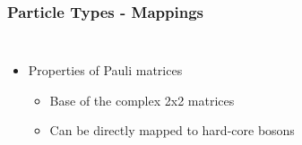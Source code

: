     \begin{frame}[t]
        \frametitle{Particle Types - Mappings}
        
        \begin{columns}[t]
                \begin{itemize}
                    \item Properties of Pauli matrices \pause
                    \begin{itemize}
                        \item Base of the complex 2x2 matrices \pause
                        \item Can be directly mapped to hard-core bosons
                    \end{itemize}
                \end{itemize}
    
            \onslide
                \vspace{-0.5cm}
                \pause[3]
                \vspace{0.1cm}
    

\end{columns}
\end{frame}
